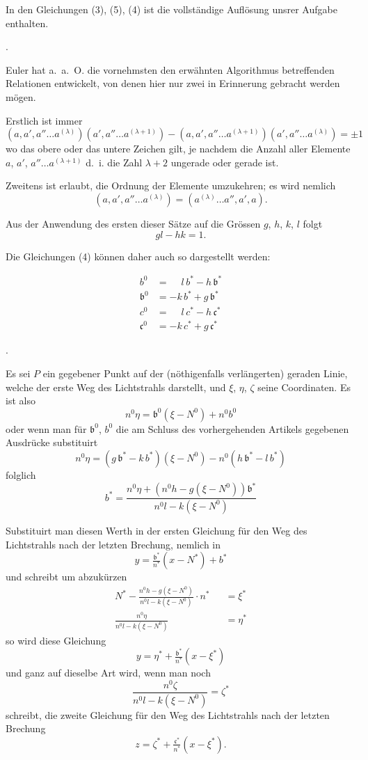 \documentclass[11pt,a4paper]{article}
\begin{document}
In den Gleichungen (3), (5), (4) ist die vollständige Auflösung unsrer Aufgabe enthalten.

\bigskip{}.

\smallskip
Euler hat a.~a.~O. die vornehmsten den erwähnten Algorithmus betreffenden Relationen entwickelt, von denen hier nur zwei in Erinnerung gebracht werden mögen.

Erstlich ist immer
\[
(a, a', a'' \ldots a^{(\lambda)}) (a', a'' \ldots a^{(\lambda+1)}) - (a, a', a'' \ldots a^{(\lambda+1)}) (a', a'' \ldots a^{(\lambda)}) = \pm 1
\]
wo das obere oder das untere Zeichen gilt, je nachdem die Anzahl aller Elemente $a$, $a'$, $a'' \ldots a^{(\lambda+1)}$ d.~i. die Zahl $\lambda + 2$ ungerade oder gerade ist.

Zweitens ist erlaubt, die Ordnung der Elemente umzukehren; es wird nemlich
\[
(a, a', a'' \ldots a^{(\lambda)}) = (a^{(\lambda)} \ldots a'', a', a).
\]

Aus der Anwendung des ersten dieser Sätze auf die Grössen $g$, $h$, $k$, $l$ folgt
\[
gl - hk = 1.
\]

Die Gleichungen (4) können daher auch so dargestellt werden:

\newpage
\noindent
\begin{align*}
b^0 &= \phantom{-}l\,b^* - h\,\mathfrak{b}^* \\
\mathfrak{b}^0 &= -k\,b^* + g\,\mathfrak{b}^* \\
c^0 &= \phantom{-}l\,c^* - h\,\mathfrak{c}^* \\
\mathfrak{c}^0 &= -k\,c^* + g\,\mathfrak{c}^*
\end{align*}

\bigskip{}.

\smallskip
Es sei $P$ ein gegebener Punkt auf der (nöthigenfalls verlängerten) geraden Linie, welche der erste Weg des Lichtstrahls darstellt, und $\xi$, $\eta$, $\zeta$ seine Coordinaten. Es ist also
\[
n^0 \eta = \mathfrak{b}^0(\xi - N^0) + n^0 b^0
\]
oder wenn man für $\mathfrak{b}^0$, $b^0$ die am Schluss des vorhergehenden Artikels gegebenen Ausdrücke substituirt
\[
n^0 \eta = (g\,\mathfrak{b}^* - k\,b^*)(\xi - N^0) - n^0(h\,\mathfrak{b}^* - l\,b^*)
\]
folglich
\[
b^* = \frac{n^0 \eta + (n^0 h - g(\xi - N^0)) \mathfrak{b}^*}{n^0 l - k(\xi - N^0)}
\]

Substituirt man diesen Werth in der ersten Gleichung für den Weg des Lichtstrahls nach der letzten Brechung, nemlich in
\[
y = \tfrac{\mathfrak{b}^*}{n^*}(x - N^*) + b^*
\]
und schreibt um abzukürzen
\begin{align*}
N^* - \frac{n^0 h - g(\xi - N^0)}{n^0 l - k(\xi - N^0)} \cdot n^* &= \xi^* \\
\frac{n^0 \eta}{n^0 l - k(\xi - N^0)} \qquad\qquad\quad &= \eta^*
\end{align*}
so wird diese Gleichung
\[
y = \eta^* + \tfrac{\mathfrak{b}^*}{n^*}(x - \xi^*)
\]
und ganz auf dieselbe Art wird, wenn man noch
\[
\frac{n^0 \zeta}{n^0 l - k(\xi - N^0)} = \zeta^*
\]
schreibt, die zweite Gleichung für den Weg des Lichtstrahls nach der letzten Brechung
\[
z = \zeta^* + \tfrac{\mathfrak{c}^*}{n^*}(x - \xi^*).
\]
\end{document}
